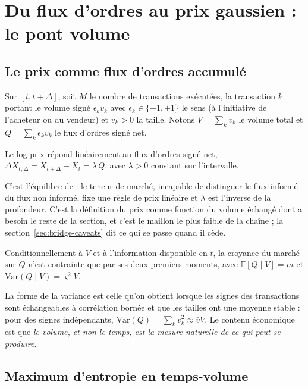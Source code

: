 \section{Du flux d'ordres au prix gaussien : le pont volume}
\label{sec:bridge}

\subsection{Le prix comme flux d'ordres accumulé}

Sur $[t,t+\Delta]$, soit $M$ le nombre de transactions exécutées, la transaction
$k$ portant le volume signé $\epsilon_k v_k$ avec $\epsilon_k\in\{-1,+1\}$ le
sens (à l'initiative de l'acheteur ou du vendeur) et $v_k>0$ la taille. Notons
$V=\sum_k v_k$ le volume total et $Q=\sum_k \epsilon_k v_k$ le flux d'ordres
signé net.

\begin{assumption}\label{as:impact}
Le log-prix répond linéairement au flux d'ordres signé net,
$\Delta X_{t,\Delta} = X_{t+\Delta}-X_t = \lambda\,Q$, avec $\lambda>0$ constant
sur l'intervalle.
\end{assumption}

C'est l'équilibre de \citet{kyle1985} : le teneur de marché, incapable de
distinguer le flux informé du flux non informé, fixe une règle de prix linéaire
et $\lambda$ est l'inverse de la profondeur. C'est la définition du \og prix
comme fonction du volume échangé \fg{} dont a besoin le reste de la section, et
c'est le maillon le plus faible de la chaîne ; la
section~\ref{sec:bridge-caveats} dit ce qui se passe quand il cède.

\begin{assumption}
\label{as:signs}
Conditionnellement à $V$ et à l'information disponible en $t$, la croyance du
marché sur $Q$ n'est contrainte que par ses deux premiers moments, avec
$\mathbb{E}[Q\mid V] = m$ et $\mathrm{Var}(Q\mid V) = \varsigma^2 V$.
\end{assumption}

La forme de la variance est celle qu'on obtient lorsque les signes des
transactions sont échangeables à corrélation bornée et que les tailles ont une
moyenne stable : pour des signes indépendants,
$\mathrm{Var}(Q)=\sum_k v_k^2 \approx \bar v V$. Le contenu économique est que
\emph{le volume, et non le temps, est la mesure naturelle de ce qui peut se
produire}.

\subsection{Maximum d'entropie en temps-volume}

